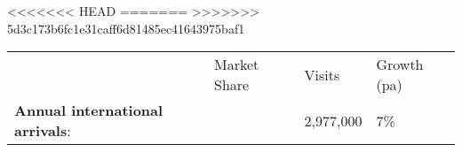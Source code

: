 <<<<<<< HEAD
=======
>>>>>>> 5d3c173b6fc1e31caff6d81485ec41643975baf1
\begin{tabular}[t]{p{2.95cm}>{\hfill}p{1.35cm}>{\hfill}p{1.1cm}>{\hfill}p{1.7cm}}
   & Market Share & Visits & Growth (pa) \\ 
 \textbf{Annual international arrivals}: &   & 2,977,000 & 7\% \\ 
  \end{tabular}
